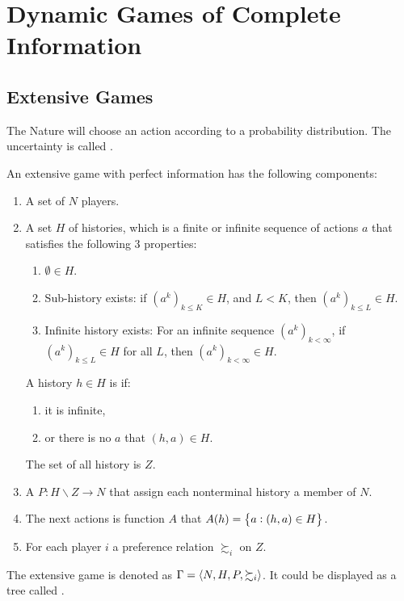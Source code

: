 \section{Dynamic Games of Complete Information}

\subsection{Extensive Games}

\begin{definition}
    The Nature will choose an action according to a probability distribution. The uncertainty is called .
\end{definition}

\begin{definition}
    An extensive game with perfect information has the following components:
    \begin{enumerate}
        \item A set of $N$ players.
        \item A set $H$ of histories, which is a finite or infinite sequence of actions $a$ that satisfies the following 3 properties:
            \begin{enumerate}
                \item $\emptyset \in H$.
                \item Sub-history exists: if $(a^k)_{k \leq K} \in H$, and $L < K$, then $(a^k)_{k \leq L} \in H$.
                \item Infinite history exists: For an infinite sequence $(a^k)_{k < \infty}$, if $(a^k)_{k \leq L} \in H$ for all $L$, then $(a^k)_{k < \infty} \in H$.
            \end{enumerate}
            A history $h \in H$ is  if:
            \begin{enumerate}
                \item it is infinite,
                \item or there is no $a$ that $(h, a) \in H$.
            \end{enumerate}
            The set of all  history is $Z$.
        \item A  $P: H\backslash Z \rightarrow N$ that assign each nonterminal history a member of $N$.
        \item The next actions is function $A$ that $A(h) = \set{a: (h, a) \in H}$.
        \item For each player $i$ a preference relation $\succsim_i$ on $Z$.
    \end{enumerate}
    The extensive game is denoted as $\Gamma = \mleft\langle N, H, P, \succsim_i \mright\rangle$. It could be displayed as a tree called .
\end{definition}


